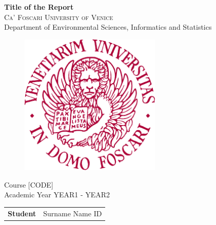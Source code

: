 \begin{titlepage}
    \vspace*{1 cm}
    \begin{center}
         {\LARGE \textbf{Title of the Report}\\}
        \vspace{2 cm}
        \textsc{Ca' Foscari University of Venice}\\
        Department of Environmental Sciences, Informatics and Statistics\\
        \vspace{0.2 cm}
        \begin{figure}[h!]
        	\centering
        	\includegraphics[width=0.6\textwidth]{logo} 
        \end{figure}
        \vspace{0.0 cm} Course [CODE]\\
        Academic Year YEAR1 - YEAR2\\
        \vspace{3.0 cm}
        	
        \begin{flushleft}
        	\begin{tabular}{l l}
        		\textbf{Student} & Surname Name ID\\
        	\end{tabular}
        \end{flushleft}
    \end{center}
\end{titlepage}
